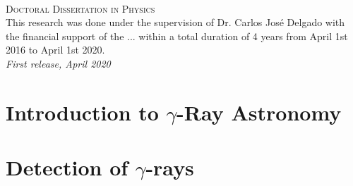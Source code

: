 \documentclass[12pt,fleqn,aas_macros]{book} %
\begin{document}

\newpage
~\vfill
\thispagestyle{empty}


\noindent \textsc{Doctoral Dissertation in Physics}\\

\noindent This research was done under the supervision of Dr. Carlos José Delgado with the financial support of the ... within a total duration of 4 years from April 1st 2016 to April 1st 2020.\\ %

\noindent \textit{First release, April 2020} %
\fi


\pagestyle{empty} %

\tableofcontents %


\pagestyle{fancy} %



\chapter{Introduction to $\gamma$-Ray Astronomy} \label{cap:gammarayastro}



\chapter{Detection of $\gamma$-rays}

\end{document}

